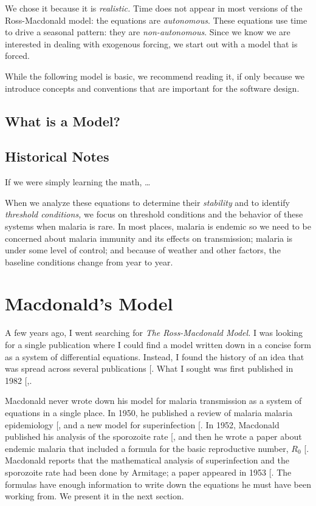 \documentclass[
]{book}
\begin{document}
We chose it because it is \emph{realistic.} Time does not appear in most versions of the Ross-Macdonald model: the equations are \emph{autonomous}. These equations use time to drive a seasonal pattern: they are \emph{non-autonomous}. Since we know we are interested in dealing with exogenous forcing, we start out with a model that is forced.

While the following model is basic, we recommend reading it, if only because we introduce concepts and conventions that are important for the software design.

\section{What is a Model?}\label{what-is-a-model}

\section{Historical Notes}\label{historical-notes-1}

If we were simply learning the math, \ldots{}

When we analyze these equations to determine their \emph{stability} and to identify \emph{threshold conditions,} we focus on threshold conditions and the behavior of these systems when malaria is rare. In most places, malaria is endemic so we need to be concerned about malaria immunity and its effects on transmission; malaria is under some level of control; and because of weather and other factors, the baseline conditions change from year to year.

\chapter{Macdonald's Model}\label{macdonalds-model}

A few years ago, I went searching for \emph{The Ross-Macdonald Model.} I was looking for a single publication where I could find a model written down in a concise form as a system of differential equations. Instead, I found the history of an idea that was spread across several publications {[}\citeproc{ref-SmithDL2012_RossMacdonald}{2}{]}.
What I sought was first published in 1982 {[},\citeproc{ref-BaileyNTJ1982BiomathematicsMalaria}{58}{]}.

Macdonald never wrote down his model for malaria transmission as a system of equations in a single place.
In 1950, he published a review of malaria malaria epidemiology {[}\citeproc{ref-MacdonaldG1950Epidemiology}{59}{]}, and a new model for superinfection {[}\citeproc{ref-MacdonaldG1950Superinfection}{60}{]}.
In 1952, Macdonald published his analysis of the sporozoite rate {[}\citeproc{ref-MacdonaldG1952Sporozoite}{38}{]}, and then he wrote a paper about endemic malaria that included a formula for the basic reproductive number, \(R_0\) {[}\citeproc{ref-MacdonaldG1952R0}{39}{]}.
Macdonald reports that the mathematical analysis of superinfection and the sporozoite rate had been done by Armitage; a paper appeared in 1953 {[}\citeproc{ref-ArmitageP1953}{61}{]}.
The formulas have enough information to write down the equations he must have been working from.
We present it in the next section.
\end{document}
